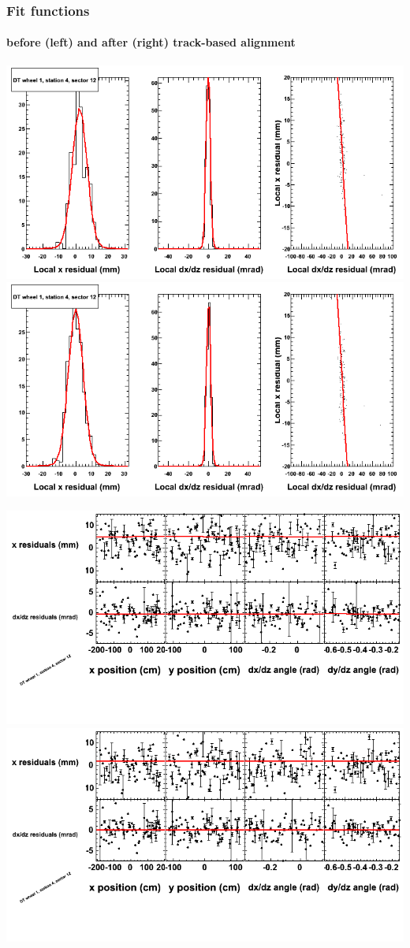 \documentclass[compress]{beamer}
\begin{document}
\begin{frame}
\frametitle{Fit functions}
\framesubtitle{before (left) and after (right) track-based alignment}
\includegraphics[width=0.5\linewidth]{fitfunctions_re01/MBwhDst4sec12_bellcurves.png} \includegraphics[width=0.5\linewidth]{fitfunctions_re05/MBwhDst4sec12_bellcurves.png}

\includegraphics[width=0.5\linewidth]{fitfunctions_re01/MBwhDst4sec12_polynomials.png} \includegraphics[width=0.5\linewidth]{fitfunctions_re05/MBwhDst4sec12_polynomials.png}
\end{frame}
\end{document}
